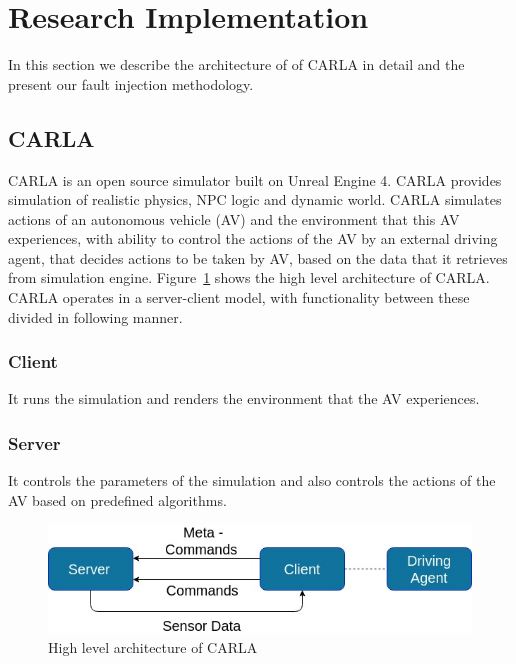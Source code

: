 \section{Research Implementation} 
In this section we describe the architecture of of CARLA in detail and the present our fault injection methodology. 

\subsection{CARLA} \label{ri-carla}
CARLA is an open source simulator built on Unreal Engine 4. CARLA provides simulation of realistic physics, NPC logic and dynamic world. CARLA simulates actions of an autonomous vehicle (AV) and the environment that this AV experiences, with ability to control the actions of the AV by an external driving agent,  that decides actions to be taken by AV, based on the data that it retrieves from simulation engine. Figure~\ref{fig:carla_arch} shows the high level architecture of CARLA. CARLA operates in a server-client model, with functionality between these divided in following manner.

\subsubsection{Client} It runs the simulation and renders the environment that the AV experiences.

\subsubsection{Server} It controls the parameters of the simulation and also controls the actions of the AV based on predefined algorithms. 

\begin{figure}  [h]
	\vspace{-0.5em}
	\centering
	\includegraphics[scale=0.4]{CARLA_block}
	\vspace{-0.5em}
	\caption{High level architecture of CARLA}
	\label{fig:carla_arch}
	\vspace{-1.5em}
\end{figure}

